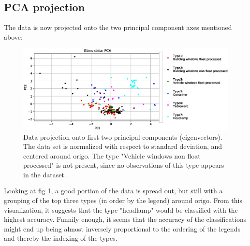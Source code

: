 \subsection{PCA projection}

The data is now projected onto the two principal component axes mentioned above:

\begin{figure}[H]
    \centering
    \includegraphics[width=1\linewidth]{fig/PCAStdNormed.eps}
    \caption{Data projection onto first two principal components (eigenvectors). The data set is normalized with respect to standard deviation, and centered around origo. The type "Vehicle windows non float processed" is not present, since no observations of this type appears in the dataset.}
    \label{fig:PCAplot}
\end{figure}

Looking at fig \ref{fig:PCAplot}, a good portion of the data is spread out, but still with a grouping of the top three types (in order by the legend) around origo. From this visualization, it suggests that the type "headlamp" would be classified with the highest accuracy. Funnily enough, it seems that the accuracy of the classifications might end up being almost inversely proportional to the ordering of the legends and thereby the indexing of the types. 